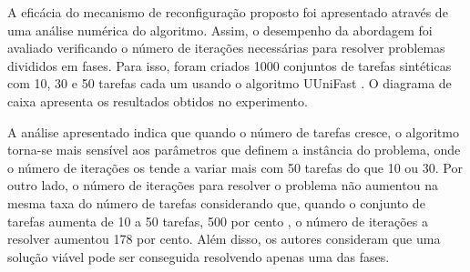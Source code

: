 A eficácia do mecanismo de reconfiguração proposto foi apresentado através de uma análise numérica do algoritmo. Assim, o desempenho da abordagem foi avaliado verificando o número de iterações necessárias para resolver problemas divididos em fases. Para isso, foram criados 1000 conjuntos de tarefas sintéticas com 10, 30 e 50 tarefas cada um usando o algoritmo UUniFast \cite{bini2005measuring}. O diagrama de caixa  apresenta os resultados obtidos no experimento.

A análise apresentado indica que quando o número de tarefas cresce, o algoritmo torna-se mais sensível aos parâmetros que definem a instância do problema, onde o número de iterações os tende a variar mais com 50 tarefas do que 10 ou 30. Por outro lado, o número de iterações para resolver o problema não aumentou na mesma taxa do número de tarefas considerando que, quando o conjunto de tarefas aumenta de 10 a 50 tarefas, 500 por cento , o número de iterações a resolver aumentou 178 por cento. Além disso, os autores consideram que uma solução viável pode ser conseguida resolvendo apenas uma das fases.



